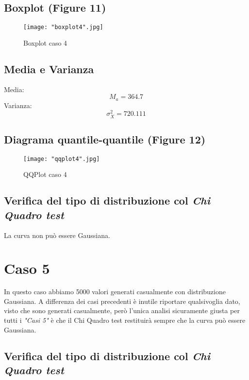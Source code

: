 \documentclass[a4paper]{article}
\begin{document}
\subsection{Boxplot (Figure 11)}
\begin{figure}[htp]
	\centering
	\texttt{[image: "boxplot4".jpg]}
	\caption{Boxplot caso 4}
	\label{}
\end{figure}

\subsection{Media e Varianza}
Media: 
\begin{equation}
	M_{a} = 364.7
\end{equation}
Varianza: 
\begin{equation}
	\sigma _{X}^{2} = 720.111
\end{equation}

\subsection{Diagrama quantile-quantile (Figure 12)}
\begin{figure}[htp]
	\centering
	\texttt{[image: "qqplot4".jpg]}
	\caption{QQPlot caso 4}
	\label{}
\end{figure}

\subsection{Verifica del tipo di distribuzione col \emph{Chi Quadro test}}

La curva non può essere Gaussiana.



\section{Caso 5}
In questo caso abbiamo 5000 valori generati casualmente con distribuzione Gaussiana.
A differenza dei casi precedenti è inutile riportare qualsivoglia dato, visto che sono generati casualmente, però l'unica analisi sicuramente giusta per tutti i \emph{"Casi 5"} è che il Chi Quadro test restituirà sempre che la curva può essere Gaussiana.
\\



\subsection{Verifica del tipo di distribuzione col \emph{Chi Quadro test}}
\end{document}

